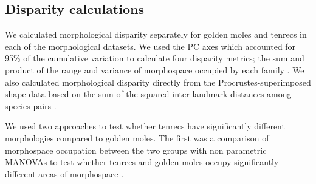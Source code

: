 \documentclass[12pt,a4paper]{article}
\begin{document}
	
\subsection{Disparity calculations}

	We calculated morphological disparity separately for golden moles and tenrecs in each of the morphological datasets. We used the PC axes which accounted for 95\% of the cumulative variation to calculate four disparity metrics; the sum and product of the range and variance of morphospace occupied by each family \citep{Brusatte2008, Foth2012, Ruta2013}. We also calculated morphological disparity directly from the Procrustes-superimposed shape data based on the sum of the squared inter-landmark distances among species pairs \citep[SSqDist,][]{Zelditch2012}. 

	We used two approaches to test whether tenrecs have significantly different morphologies compared to golden moles. The first was a comparison of morphospace occupation between the two groups with non parametric MANOVAs \citep{Anderson2001} to test whether tenrecs and golden moles occupy significantly different areas of morphospace \citep[e.g][]{Serb2011, Ruta2013}.
	 
\end{document}
